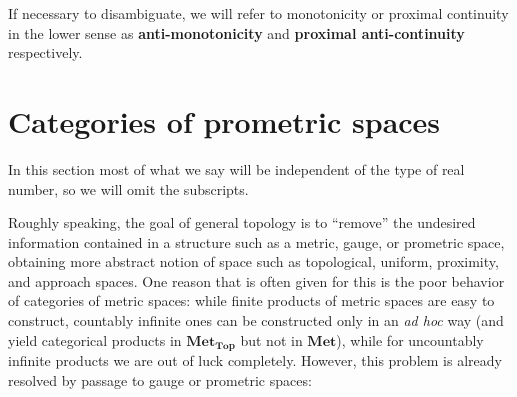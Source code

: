 \documentclass{article}
\def\Met{\mathbf{Met}}
\def\MetTop{\mathbf{Met}_{\mathbf{Top}}}
\begin{document}
If necessary to disambiguate, we will refer to monotonicity or proximal continuity in the lower sense as \textbf{anti-monotonicity} and \textbf{proximal anti-continuity} respectively.


\section{Categories of prometric spaces}
\label{sec:sub-promet}

In this section most of what we say will be independent of the type of real number, so we will omit the subscripts.

Roughly speaking, the goal of general topology is to ``remove'' the undesired information contained in a structure such as a metric, gauge, or prometric space, obtaining more abstract notion of space such as topological, uniform, proximity, and approach spaces.
One reason that is often given for this is the poor behavior of categories of metric spaces: while finite products of metric spaces are easy to construct, countably infinite ones can be constructed only in an \textit{ad hoc} way (and yield categorical products in $\MetTop$ but not in $\Met$), while for uncountably infinite products we are out of luck completely.
However, this problem is already resolved by passage to gauge or prometric spaces:
\end{document}
